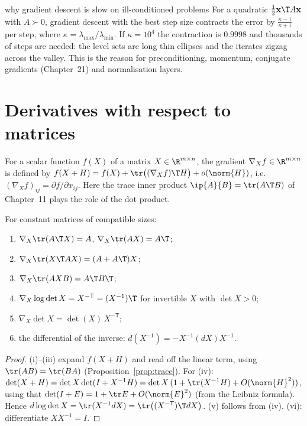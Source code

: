 \begin{interview}{why gradient descent is slow on ill-conditioned problems}
For a quadratic $\tfrac12\mathbf{x}\T A\mathbf{x}$ with $A\succ0$, gradient descent with the best step size contracts the error by $\frac{\kappa-1}{\kappa+1}$ per step, where $\kappa=\lambda_{\max}/\lambda_{\min}$. If $\kappa=10^4$ the contraction is $0.9998$ and thousands of steps are needed: the level sets are long thin ellipses and the iterates zigzag across the valley. This is the reason for preconditioning, momentum, conjugate gradients (Chapter~21) and normalisation layers.
\end{interview}

\section{Derivatives with respect to matrices}

For a scalar function $f(X)$ of a matrix $X\in\R^{m\times n}$, the gradient $\nabla_Xf\in\R^{m\times n}$ is defined by $f(X+H)=f(X)+\tr\big((\nabla_Xf)\T H\big)+o(\norm{H})$, i.e.\ $(\nabla_Xf)_{ij}=\partial f/\partial x_{ij}$. Here the trace inner product $\ip{A}{B}=\tr(A\T B)$ of Chapter~11 plays the role of the dot product.

\begin{theorem}\label{thm:matgrad}
For constant matrices of compatible sizes:
\begin{enumerate}[label=(\roman*)]
  \item $\nabla_X\tr(A\T X)=A$, $\nabla_X\tr(AX)=A\T$;
  \item $\nabla_X\tr(X\T AX)=(A+A\T)X$;
  \item $\nabla_X\tr(AXB)=A\T B\T$;
  \item $\nabla_X\log\det X=X^{-\mathsf T}=(X^{-1})\T$ for invertible $X$ with $\det X>0$;
  \item $\nabla_X\det X=\det(X)\,X^{-\mathsf T}$;
  \item the differential of the inverse: $d(X^{-1})=-X^{-1}(dX)X^{-1}$.
\end{enumerate}
\end{theorem}

\begin{proof}
(i)--(iii) expand $f(X+H)$ and read off the linear term, using $\tr(AB)=\tr(BA)$ (Proposition~\ref{prop:trace}). For (iv): $\det(X+H)=\det X\det(I+X^{-1}H)=\det X\,(1+\tr(X^{-1}H)+O(\norm{H}^2))$, using that $\det(I+E)=1+\tr E+O(\norm{E}^2)$ (from the Leibniz formula). Hence $d\log\det X=\tr(X^{-1}dX)=\tr\big((X^{-\mathsf T})\T dX\big)$. (v) follows from (iv). (vi): differentiate $XX^{-1}=I$.
\end{proof}

